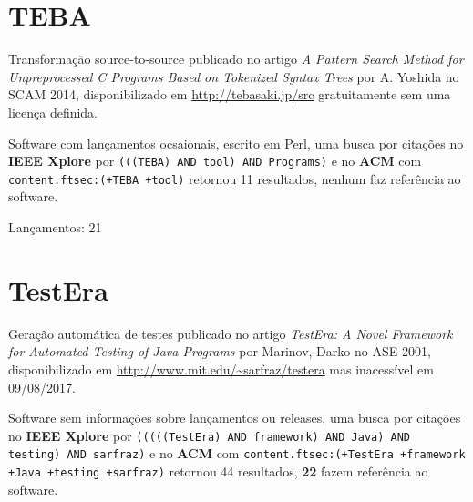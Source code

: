 \section{TEBA}

Transformação source-to-source
publicado no artigo {\it A Pattern Search Method for Unpreprocessed C Programs Based on Tokenized Syntax Trees}
por A. Yoshida
no SCAM 2014,
disponibilizado em \url{http://tebasaki.jp/src}
gratuitamente
sem uma licença definida.

Software com lançamentos ocsaionais,
escrito em Perl,
uma busca por citações no {\bf IEEE Xplore} por
\texttt{(((TEBA) AND tool) AND Programs)}
e no {\bf ACM} com
\texttt{content.ftsec:(+TEBA +tool)}
retornou
11 resultados,
nenhum faz referência ao software.


Lançamentos: 21

\section{TestEra}

Geração automática de testes
publicado no artigo {\it TestEra: A Novel Framework for Automated Testing of Java Programs}
por Marinov, Darko
no ASE 2001,
disponibilizado em \url{http://www.mit.edu/~sarfraz/testera}
mas inacessível em 09/08/2017.

Software sem informações sobre lançamentos ou releases,
uma busca por citações no {\bf IEEE Xplore} por
\texttt{(((((TestEra) AND framework) AND Java) AND testing) AND sarfraz)}
e no {\bf ACM} com
\texttt{content.ftsec:(+TestEra +framework +Java +testing +sarfraz)}
retornou
44 resultados,
{\bf 22} fazem referência ao software.

